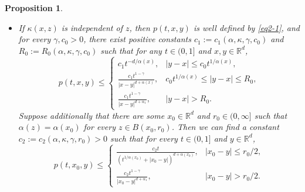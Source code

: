 \documentclass[a4paper,11pt]{amsart}
\renewcommand{\le}{\leqslant}
\newcommand{\R}{\mathds R}
\newcommand{\K}{\kappa}
\newcommand{\A}{\alpha}
\newcommand{\G}{\gamma}
\newtheorem{proposition}[theorem]{Proposition}
\theoremstyle{definition}
\begin{document}
\begin{proposition}\label{p3-2} \begin{itemize}
\item[(1)] If $\K(x,z)$ is independent of $z$, then $p(t,x,y)$ is well defined by
\eqref{eq2-1}, and for every $\gamma,c_0>0$, there exist positive
constants $c_1:=c_1(\A,\K,\G,c_0)$ and $R_0:=R_0(\A,\K,\G,c_0)$ such that for any $t\in (0,1]$ and $x,y\in \R^d$,
\begin{equation}\label{p3-2-1}
p(t,x,y)\le
\begin{cases}
c_1t^{-{d/\A(x)}}, & |y-x|\le c_0t^{{1/\A(x)}},\\
\frac{c_1t^{1-\G}}{|x-y|^{d+\A(x)}},& c_0t^{{1/\A(x)}}\le |y-x|\le R_0,\\
\frac{c_1t^{1-\gamma}}{|x-y|^{d+\A_1}},&|y-x|> R_0.
\end{cases}
\end{equation} Suppose additionally that there are some $x_0 \in \R^d$ and $r_0\in(0,\infty]$ such that
$\alpha(z)=\alpha(x_0)$ for every $z \in B(x_0,r_0)$. Then we can
find a constant $c_2:=c_2(\A,\K,\G,r_0)>0$ such that for every $t\in (0,1]$ and $y \in
\R^d$,
\begin{equation}\label{p3-2-2}
p(t,x_0,y)\le
\begin{cases}
\frac{c_2 t }{(t^{{1/\A(x_0)}}+|x_0-y|)^{d+\A(x_0)}},& |x_0-y|\le {r_0}/{2},\\
\frac{c_2 t^{1-\G} }{|x_0-y|^{d+\A_1}},&|x_0-y|>{r_0}/{2}.
\end{cases}
\end{equation}



\end{itemize}
\end{proposition}
\end{document}
